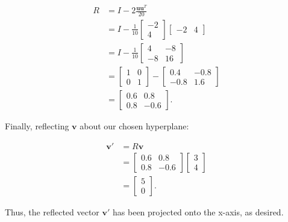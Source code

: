 \begin{align*}
R &= I - 2\frac{\mathbf{u}\mathbf{u}^T}{20} \\
&= I - \frac{1}{10}\begin{bmatrix} -2 \\ 4 \end{bmatrix}\begin{bmatrix} -2 & 4 \end{bmatrix} \\
&= I - \frac{1}{10}\begin{bmatrix} 4 & -8 \\ -8 & 16 \end{bmatrix} \\
&= \begin{bmatrix} 1 & 0 \\ 0 & 1 \end{bmatrix} - \begin{bmatrix} 0.4 & -0.8 \\ -0.8 & 1.6 \end{bmatrix} \\
&= \begin{bmatrix} 0.6 & 0.8 \\ 0.8 & -0.6 \end{bmatrix}.
\end{align*}

Finally, reflecting \( \mathbf{v} \) about our chosen hyperplane:

\begin{align*}
\mathbf{v}' &= R\mathbf{v} \\
&= \begin{bmatrix} 0.6 & 0.8 \\ 0.8 & -0.6 \end{bmatrix}\begin{bmatrix} 3 \\ 4 \end{bmatrix} \\
&= \begin{bmatrix} 5 \\ 0 \end{bmatrix}.
\end{align*}

Thus, the reflected vector \( \mathbf{v}' \) has been projected onto the x-axis, as desired.
